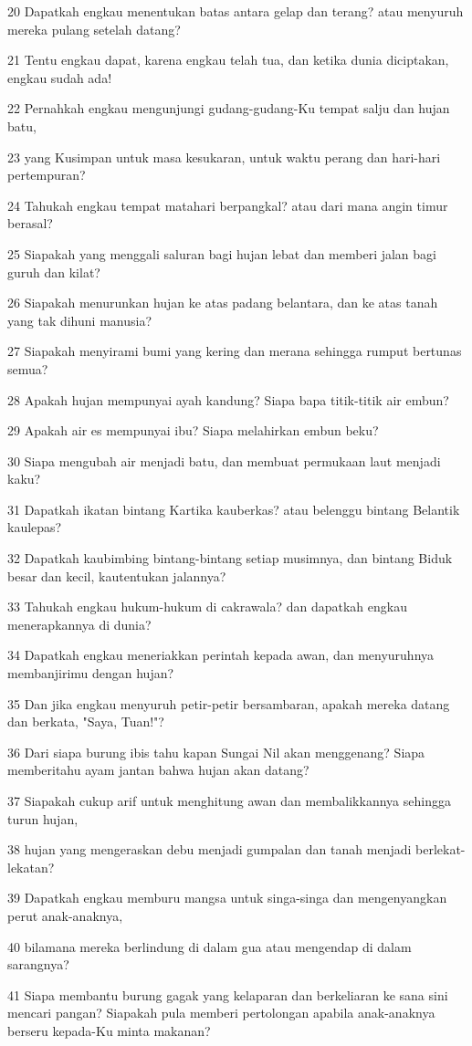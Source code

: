 \par 20 Dapatkah engkau menentukan batas antara gelap dan terang? atau menyuruh mereka pulang setelah datang?
\par 21 Tentu engkau dapat, karena engkau telah tua, dan ketika dunia diciptakan, engkau sudah ada!
\par 22 Pernahkah engkau mengunjungi gudang-gudang-Ku tempat salju dan hujan batu,
\par 23 yang Kusimpan untuk masa kesukaran, untuk waktu perang dan hari-hari pertempuran?
\par 24 Tahukah engkau tempat matahari berpangkal? atau dari mana angin timur berasal?
\par 25 Siapakah yang menggali saluran bagi hujan lebat dan memberi jalan bagi guruh dan kilat?
\par 26 Siapakah menurunkan hujan ke atas padang belantara, dan ke atas tanah yang tak dihuni manusia?
\par 27 Siapakah menyirami bumi yang kering dan merana sehingga rumput bertunas semua?
\par 28 Apakah hujan mempunyai ayah kandung? Siapa bapa titik-titik air embun?
\par 29 Apakah air es mempunyai ibu? Siapa melahirkan embun beku?
\par 30 Siapa mengubah air menjadi batu, dan membuat permukaan laut menjadi kaku?
\par 31 Dapatkah ikatan bintang Kartika kauberkas? atau belenggu bintang Belantik kaulepas?
\par 32 Dapatkah kaubimbing bintang-bintang setiap musimnya, dan bintang Biduk besar dan kecil, kautentukan jalannya?
\par 33 Tahukah engkau hukum-hukum di cakrawala? dan dapatkah engkau menerapkannya di dunia?
\par 34 Dapatkah engkau meneriakkan perintah kepada awan, dan menyuruhnya membanjirimu dengan hujan?
\par 35 Dan jika engkau menyuruh petir-petir bersambaran, apakah mereka datang dan berkata, "Saya, Tuan!"?
\par 36 Dari siapa burung ibis tahu kapan Sungai Nil akan menggenang? Siapa memberitahu ayam jantan bahwa hujan akan datang?
\par 37 Siapakah cukup arif untuk menghitung awan dan membalikkannya sehingga turun hujan,
\par 38 hujan yang mengeraskan debu menjadi gumpalan dan tanah menjadi berlekat-lekatan?
\par 39 Dapatkah engkau memburu mangsa untuk singa-singa dan mengenyangkan perut anak-anaknya,
\par 40 bilamana mereka berlindung di dalam gua atau mengendap di dalam sarangnya?
\par 41 Siapa membantu burung gagak yang kelaparan dan berkeliaran ke sana sini mencari pangan? Siapakah pula memberi pertolongan apabila anak-anaknya berseru kepada-Ku minta makanan?

